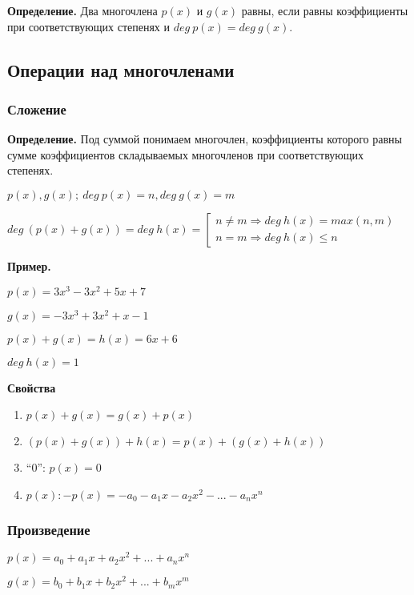 \documentclass{article}
\begin{document}
    \textbf{Определение.} Два многочлена \(p(x)\) и \(g(x)\) равны, если равны коэффициенты при соответствующих степенях и \(deg\  p(x) = deg\  g(x)\).

    \subsection{Операции над многочленами}

    \subsubsection{Сложение}

    \textbf{Определение.} Под суммой понимаем многочлен, коэффициенты которого равны сумме коэффициентов складываемых многочленов при соответствующих степенях.

    \(p(x), g(x);\ deg\  p(x) = n, deg\  g(x) = m\)

    \(deg\ (p(x)+g(x)) = deg\  h(x) = \left[ \begin{array}{l} n \neq m \Rightarrow deg\  h(x) = max(n, m)\\ n = m \Rightarrow deg\  h(x) \leq n \end{array} \right.\)

    \textbf{Пример.} 

    \( p(x) = 3x^3 - 3x^2 + 5x + 7 \)
    
    \( g(x) = -3x^3 + 3x^2 + x - 1 \)

    \( p(x) + g(x) = h(x) = 6x + 6 \)
    
    \( deg\ h(x) = 1 \) 

    \textbf{Свойства}
    \begin{enumerate}
        \item \( p(x) + g(x) = g(x) + p(x) \)
        \item \( (p(x) + g(x)) + h(x) = p(x) + (g(x) + h(x)) \)
        \item ``$0$'': \( p(x) = 0 \)
        \item \( p(x): -p(x) = -a_0 - a_1x - a_2x^2 - ... - a_nx^n \)
    \end{enumerate}

    \subsubsection{Произведение}

    \( p(x) = a_0 + a_1x + a_2x^2 + ... + a_nx^n \)

    \( g(x) = b_0 + b_1x + b_2x^2 + ... + b_mx^m \)
\end{document}
